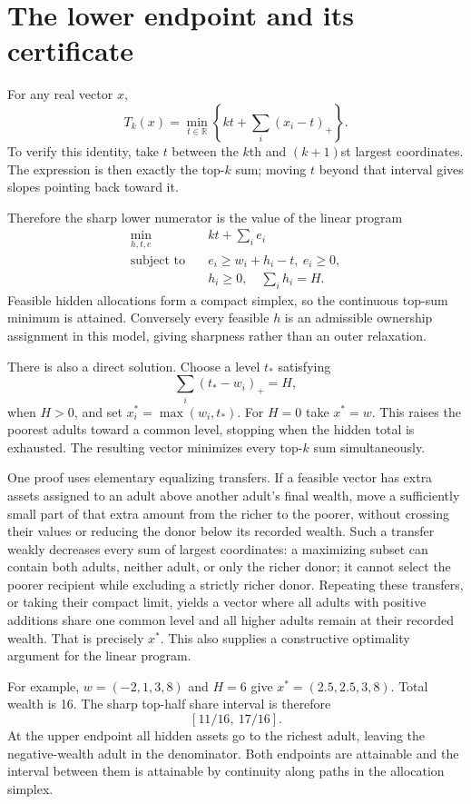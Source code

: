 \documentclass[11pt]{article}
\newcommand{\R}{\mathbb R}
\begin{document}
\section*{The lower endpoint and its certificate}
For any real vector $x$,
\[
 T_k(x)=\min_{t\in\R}\left\{kt+\sum_i(x_i-t)_+\right\}.
\]
To verify this identity, take $t$ between the $k$th and $(k+1)$st largest coordinates. The expression is then exactly the top-$k$ sum; moving $t$ beyond that interval gives slopes pointing back toward it.

Therefore the sharp lower numerator is the value of the linear program
\[
 \begin{aligned}
 \min_{h,t,e}\quad &kt+\sum_i e_i\\
 \text{subject to}\quad&e_i\geq w_i+h_i-t,\ e_i\geq0,\\
 &h_i\geq0,\quad\sum_i h_i=H.
 \end{aligned}
\]
Feasible hidden allocations form a compact simplex, so the continuous top-sum minimum is attained. Conversely every feasible $h$ is an admissible ownership assignment in this model, giving sharpness rather than an outer relaxation.

There is also a direct solution. Choose a level $t_*$ satisfying
\[
 \sum_i(t_*-w_i)_+=H,
\]
when $H>0$, and set $x_i^*=\max(w_i,t_*)$. For $H=0$ take $x^*=w$. This raises the poorest adults toward a common level, stopping when the hidden total is exhausted. The resulting vector minimizes every top-$k$ sum simultaneously.

One proof uses elementary equalizing transfers. If a feasible vector has extra assets assigned to an adult above another adult's final wealth, move a sufficiently small part of that extra amount from the richer to the poorer, without crossing their values or reducing the donor below its recorded wealth. Such a transfer weakly decreases every sum of largest coordinates: a maximizing subset can contain both adults, neither adult, or only the richer donor; it cannot select the poorer recipient while excluding a strictly richer donor. Repeating these transfers, or taking their compact limit, yields a vector where all adults with positive additions share one common level and all higher adults remain at their recorded wealth. That is precisely $x^*$. This also supplies a constructive optimality argument for the linear program.

For example, $w=(-2,1,3,8)$ and $H=6$ give $x^*=(2.5,2.5,3,8)$. Total wealth is 16. The sharp top-half share interval is therefore
\[
                         [11/16,\ 17/16].
\]
At the upper endpoint all hidden assets go to the richest adult, leaving the negative-wealth adult in the denominator. Both endpoints are attainable and the interval between them is attainable by continuity along paths in the allocation simplex.
\end{document}
